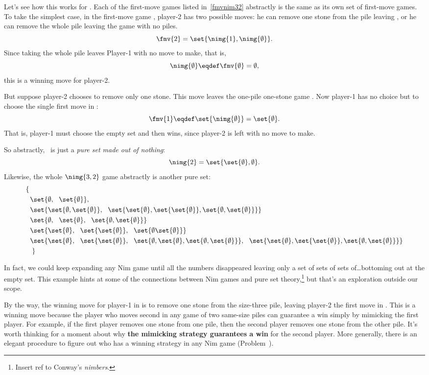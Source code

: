\begin{definition}
Let's see how this works for .  Each of the first-move games
listed in~\eqref{fmvnim32} abstractly is the same as its own set of
first-move games.  To take the simplest case, in the first-move game
, player-2 has two possible moves: he can remove one stone
from the pile leaving , or he can remove the whole pile
leaving the game \nimg{\emptyset} with no piles.
\[
\fmv{2} = \set{\nimg{1}, \nimg{\emptyset}}.
\]
Since taking the whole pile leaves Player-1 with no move to make, that is,
\[
\nimg{\emptyset} \eqdef \fmv{\emptyset} = \emptyset,
\]
this is a winning move for player-2.

But suppose player-2 chooses to remove only one stone.  This move
leaves the one-pile one-stone game .  Now player-1 has no
choice but to choose the single first move in :
\[
\fmv{1} \eqdef \set{\nimg{\emptyset}} = \set{\emptyset}.
\]
That is, player-1 must choose the empty set and then wins, since
player-2 is left with no move to make.

So abstractly, \ is just a \emph{pure set made out of
  nothing}:
\[
\nimg{2} = \set{\set{\emptyset}, \emptyset}.
\]
Likewise, the whole $\nimg{3,2}$ game abstractly is another pure set:
\begin{align*}
\left\{ \right. & \\
& \set{\emptyset,\ \ \set{\emptyset}},\\
& \set{\set{\emptyset, \set{\emptyset}},\ \ \set{\set{\emptyset}, \set{\set{\emptyset}}, \set{\emptyset, \set{\emptyset}}}}\\
& \set{\emptyset,\ \ \set{\emptyset},\ \ \set{\emptyset, \set{\emptyset}}}\\
& \set{\set{\emptyset},\ \ \set{\set{\emptyset}},\ \ \set{\emptyset \set{\emptyset}}}\\
& \set{\set{\emptyset},\ \ \set{\set{\emptyset}},\ \ \set{\emptyset, \set{\emptyset}, \set{\emptyset, \set{\emptyset}}},\ \ \set{\set{\emptyset}, \set{\set{\emptyset}}, \set{\emptyset, \set{\emptyset}}}}\\
& \left. \right\}
\end{align*}

In fact, we could keep expanding any Nim game until all the numbers
disappeared leaving only a set of sets of sets of\dots bottoming out
at the empty set.  This example hints at some of the connections
between Nim games and pure set theory,\footnote{Insert ref to Conway's
  \emph{nimbers}.}  but that's an exploration outside our scope.

By the way, the winning move for player-1 in  is to remove
one stone from the size-three pile, leaving player-2 the first move in
.  This is a winning move because the player who moves
second in any game of two same-size piles can guarantee a win simply
by mimicking the first player.  For example, if the first player
removes one stone from one pile, then the second player removes one
stone from the other pile.  It's worth thinking for a moment about why
\textbf{the mimicking strategy guarantees a win} for the second
player.  More generally, there is an elegant procedure to figure out
who has a winning strategy in any Nim game
(Problem~).


\end{definition}
